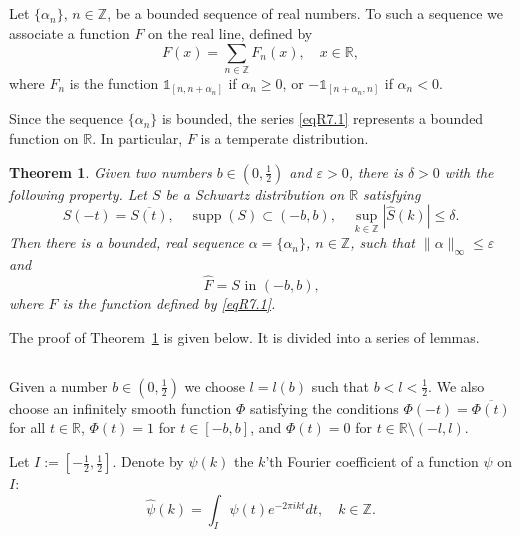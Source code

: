 \documentclass[reqno,a4paper,12pt]{amsart}
\numberwithin{equation}{section}
\numberwithin{figure}{section}
\newcommand\R{\mathbb{R}}
\newcommand\Z{\mathbb{Z}}
\newcommand\1{\mathds{1}}
\newcommand\eps{\varepsilon}
\renewcommand\leq{\leqslant}
\renewcommand\geq{\geqslant}
\newcommand\sbt{\subset}
\renewcommand\hat{\widehat}
\newcommand{\ft}[1]{\widehat{#1}}
\newcommand{\supp}{\operatorname{supp}}
\newcommand{\half}{\tfrac{1}{2}}
\theoremstyle{plain}
\newtheorem{thm}{Theorem}[section]
\newcommand{\thmref}[1]{Theorem~\ref{#1}}
\theoremstyle{definition}
\begin{document}
\subsection{}
 Let $\{\alpha_n\}$, $n\in\Z$, be a bounded sequence of real numbers. To such a sequence
 we associate a function $F$ on the real line, defined by
 \begin{equation}
\label{eqR7.1}
F(x)=\sum_{n\in\mathbb Z} F_n(x), \quad x\in\R,
 \end{equation}
 where $F_n$ is the function $\1_{[n,n+\alpha_n]}$ if $\alpha_n \geq 0$,
or  $-\1_{[n+\alpha_n,n]}$ if $\alpha_n<0$.

Since the sequence $\{\alpha_n\}$ is bounded, the series
\eqref{eqR7.1} represents a bounded function on $\R$.
In particular, $F$ is a temperate distribution.



 \begin{thm}
\label{thmR7.2}
Given two numbers $b \in (0,\half)$ and $\eps >0$,
there is $\delta>0$
with the following property. 
Let $S$ be a Schwartz distribution on $\R$ satisfying
 \begin{equation}
\label{eqR7.2.11}
S(-t) = \overline{S(t)}, \quad
\supp(S) \sbt (-b,b), \quad
\sup_{k \in \Z} |\ft{S}(k)| \leq \delta.
\end{equation}
Then there is a bounded, real sequence $\alpha = \{\alpha_n\}$, $n\in\Z$,
such that $\|\alpha\|_\infty \leq \eps$ and
 \begin{equation}
\text{$\hat F=S$ in $(-b,b)$,} 
\end{equation}
where $F$ is the function  defined by \eqref{eqR7.1}.
 \end{thm}




The proof of \thmref{thmR7.2} is given
below. It is divided into a series of lemmas.


\subsection{}
Given a number $b \in (0,\half)$ we choose $l = l(b)$ such that
 $ b<l< \half$. We also choose an infinitely smooth
 function $\Phi$ satisfying
the conditions
$\Phi(-t)=\overline{\Phi(t)}$ for all $t \in \R$,
$\Phi(t)=1$ for $t\in[-b,b]$, and
$\Phi(t)=0$ for $t \in \R \setminus (-l,l)$.


Let $I := [-\half, \half]$. Denote by
$\ft{\psi}(k)$ the $k$'th Fourier
coefficient of a function $\psi$ on $I$:
\begin{equation}
\label{eqR1.1.10}
\ft{\psi}(k) = \int_{I} \psi(t) e^{-2\pi i k t} dt, \quad k \in \Z.
\end{equation}
\end{document}
